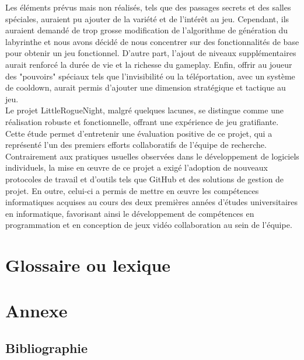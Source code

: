 \documentclass[10pt]{article}
\begin{document}
Les éléments prévus mais non réalisés, tels que des passages secrets et des salles spéciales, auraient pu ajouter de la variété et de l'intérêt au jeu. Cependant, ils auraient demandé de trop grosse modification de l'algorithme de génération du labyrinthe et nous avons décidé de nous concentrer sur des fonctionnalités de base pour obtenir un jeu fonctionnel. D'autre part, l'ajout de niveaux supplémentaires aurait renforcé la durée de vie et la richesse du gameplay. Enfin, offrir au joueur des "pouvoirs" spéciaux tels que l'invisibilité ou la téléportation, avec un système de cooldown, aurait permis d'ajouter une dimension stratégique et tactique au jeu.\\

Le projet LittleRogueNight, malgré quelques lacunes, se distingue comme une réalisation robuste et fonctionnelle, offrant une expérience de jeu gratifiante. Cette étude permet d'entretenir une évaluation positive de ce projet, qui a représenté l'un des premiers efforts collaboratifs de l'équipe de recherche. Contrairement aux pratiques usuelles observées dans le développement de logiciels individuels, la mise en œuvre de ce projet a exigé l'adoption de nouveaux protocoles de travail et d'outils tels que GitHub et des solutions de gestion de projet. En outre, celui-ci a permis de mettre en œuvre les compétences informatiques acquises au cours des deux premières années d'études universitaires en informatique, favorisant ainsi le développement de compétences en programmation et en conception de jeux vidéo collaboration au sein de l'équipe.\\
\clearpage

\section{Glossaire ou lexique}

\section{Annexe}
   \subsection{Bibliographie}
   \printglossary
\end{document}
